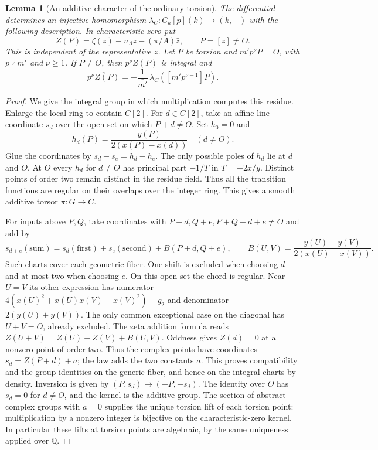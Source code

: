 \documentclass[a4paper,11pt]{article}
\newtheorem{lemma}[proposition]{Lemma}
\theoremstyle{definition}
\theoremstyle{remark}
\numberwithin{equation}{section}
\begin{document}
\begin{lemma}[An additive character of the ordinary torsion]\leavevmode
\label{lem:addext492}
The differential determines an injective homomorphism
\(\lambda_C:C_k[p](k)\longrightarrow(k,+)\) with the following
description. In characteristic zero put
\[
 Z(P)=\zeta(z)-u_\Lambda z-(\pi/A)\bar z,\qquad P=[z]\ne O.
\]
This is independent of the representative \(z\).
Let \(P\) be torsion and \(m'p^\nu P=O\), with \(p\nmid m'\)
and \(\nu\ge1\). If \(\bar P\ne O\), then \(p^\nu Z(P)\) is
integral and
\[
 \overline{p^\nu Z(P)}
     =-\frac{1}{\overline{m'}}\,\lambda_C([m'p^{\nu-1}]\bar P).
\]
\end{lemma}
\begin{proof}
We give the integral group in which multiplication computes this
residue. Enlarge the local ring to contain \(C[2]\). For
\(d\in C[2]\), take an affine-line coordinate \(s_d\) over the open
set on which \(P+d\ne O\). Set \(h_0=0\) and
\[
 h_d(P)=\frac{y(P)}{2(x(P)-x(d))}\quad(d\ne O).
\]
Glue the coordinates by \(s_d-s_e=h_d-h_e\). The only possible
poles of \(h_d\) lie at \(d\) and \(O\).
At \(O\) every \(h_d\) for \(d\ne O\) has principal part
\(-1/T\) in \(T=-2x/y\). Distinct points of order two remain
distinct in the residue field. Thus all the transition functions
are regular on their overlaps over the integer ring. This gives a
smooth additive torsor \(\pi:G\to C\).

For inputs above \(P,Q\), take coordinates with
\(P+d,Q+e,P+Q+d+e\ne O\) and add by
\[
  s_{d+e}(\text{sum})=s_d(\text{first})+s_e(\text{second})
                         +B(P+d,Q+e),\qquad
  B(U,V)=\frac{y(U)-y(V)}{2(x(U)-x(V))}.
\]
Such charts cover each geometric fiber. One shift is excluded
when choosing \(d\) and at most two when choosing \(e\).
On this open set the chord is regular. Near \(U=V\) its other
expression has numerator \(4(x(U)^2+x(U)x(V)+x(V)^2)-g_2\)
and denominator \(2(y(U)+y(V))\). The only common exceptional
case on the diagonal has \(U+V=O\), already excluded.
The zeta addition formula reads \(Z(U+V)=Z(U)+Z(V)+B(U,V)\).
Oddness gives \(Z(d)=0\) at a nonzero point of order two.
Thus the complex points have coordinates \(s_d=Z(P+d)+a\);
the law adds the two constants \(a\). This proves compatibility
and the group identities on the generic fiber, and hence on the
integral charts by density. Inversion is given by
\((P,s_d)\mapsto(-P,-s_d)\). The identity over \(O\) has
\(s_d=0\) for \(d\ne O\), and the kernel is the additive group.
The section of abstract complex groups with \(a=0\) supplies the
unique torsion lift of each torsion point: multiplication by a
nonzero integer is bijective on the characteristic-zero kernel.
In particular these lifts at torsion points are algebraic,
by the same uniqueness applied over \(\overline{\mathbb Q}\).


\end{proof}
\end{document}
